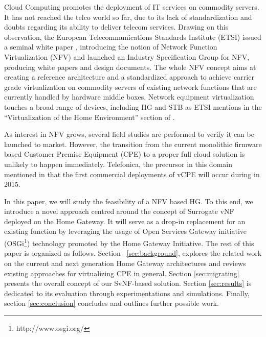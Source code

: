 Cloud Computing promotes the deployment of IT services on commodity servers. It has not reached the telco world so far, due to its lack of standardization and doubts regarding its ability to deliver telecom services. 
Drawing on this observation, the European Telecommunications Standards Institute (ETSI) issued a seminal white paper \cite{_network_2012}, introducing the notion of Network Function Virtualization (NFV) and launched an Industry Specification Group for NFV, producing white papers and design documents.
The whole NFV concept aims at creating a reference architecture and a standardized approach to achieve carrier grade virtualization on commodity servers of existing network functions that are currently handled by hardware middle boxes.
Network equipment virtualization touches a broad range of devices, including HG and STB as ETSI mentions in the “Virtualization of the Home Environment” section of \cite{_network_2013}. 

As interest in NFV grows, several field studies are performed to verify it can be launched to market.
However, the transition from the current monolithic firmware based Customer Premise Equipment (CPE) to a proper full cloud solution is unlikely to happen immediately. Telefonica, the precursor in this domain mentioned in \cite{enrique_blanco_telefonica_2015} that the first commercial deployments of vCPE will occur during in 2015.

In this paper, we will study the feasibility of a NFV based HG.  To this end, we introduce a novel  approach centred around the concept of Surrogate vNF deployed on the Home Gateway.
It will serve as a drop-in replacement for an existing function by leveraging the usage of Open Services Gateway initiative (OSGi\footnote{http://www.osgi.org/}) technology promoted by the Home Gateway Initiative.
The rest of this paper is organized as follows.
Section~ \ref{sec:background}, explores the related work on the current and next generation Home Gateway architectures and reviews existing approaches for virtualizing CPE in general.
Section \ref{sec:migrating} presents the overall concept of our SvNF-based solution. Section \ref{sec:results} is dedicated to its evaluation through experimentations and simulations. Finally, section \ref{sec:conclusion} concludes and outlines further possible work.


